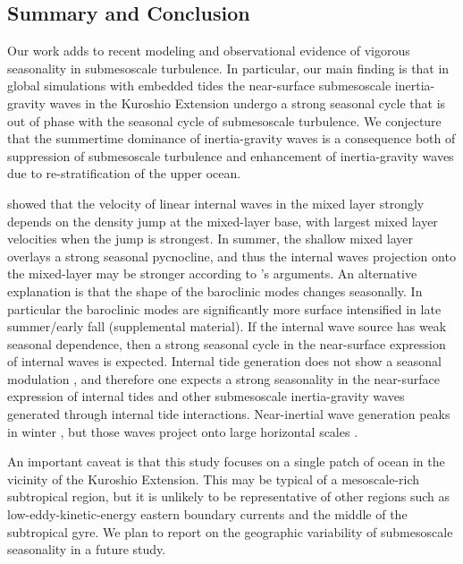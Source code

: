 \documentclass[grl]{agutex2015}
\begin{document}
\begin{article}
\section{Summary and Conclusion}
Our work adds to recent modeling \citep{sasaki_etal2014}
and observational \citep{callies_etal2015,buckingham_etal2016} evidence of vigorous seasonality in
submesoscale turbulence. In particular, our main finding is that in global simulations with embedded tides the
near-surface submesoscale inertia-gravity waves in the Kuroshio Extension undergo
a strong seasonal cycle that is out of phase with the seasonal cycle of
submesoscale turbulence. We conjecture that the summertime dominance of inertia-gravity waves
 \citep{callies_etal2015} is a consequence both of suppression of submesoscale turbulence and
enhancement of inertia-gravity waves due to re-stratification of
the upper ocean.

\cite{dasaro1978} showed that the velocity of linear internal waves
in the mixed layer strongly depends on the density jump at the mixed-layer
base, with largest mixed layer velocities when the jump is strongest.
In summer, the shallow mixed layer overlays a strong seasonal pycnocline,
and thus the internal waves projection onto the mixed-layer may be stronger
according to \cite{dasaro1978}'s arguments. An
alternative explanation is that the shape of the baroclinic modes
changes seasonally. In particular the baroclinic modes are
significantly more surface intensified in late summer/early fall
 (supplemental material).
If the internal wave source has weak seasonal dependence, then a strong
seasonal cycle in the near-surface expression of internal waves is expected.
Internal tide generation does not show a seasonal modulation \citep[e.g.,][]{alford2003},
and therefore one expects a strong seasonality in the near-surface
expression of internal tides and
other submesoscale inertia-gravity waves generated through internal tide interactions.
Near-inertial wave generation peaks in winter \citep[e.g.,][]{alford2003}, but
those waves project onto large horizontal scales \citep[e.g, ][]{qi_etal1995}.

An important caveat is that this study focuses on a single patch of ocean in the
vicinity of the Kuroshio Extension. This may be typical of a mesoscale-rich
subtropical region, but it is unlikely to be
representative of other regions such as low-eddy-kinetic-energy eastern boundary currents
and the middle of the subtropical gyre.  We plan to report on the geographic variability of submesoscale
 seasonality in a future study.


\end{article}
\end{document}
